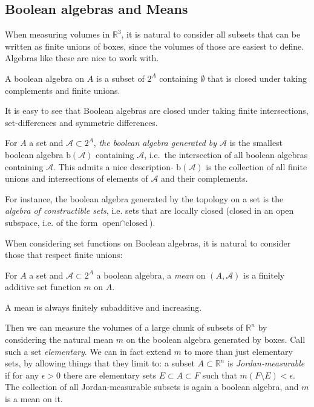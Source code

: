 \documentclass[9pt]{report}
\newtheorem[L]{theorem}{Theorem}[chapter]
\newtheorem[L,nocut]{definition}[theorem]{Definition}
\newtheorem[S,nounderline]{remark}[theorem]{Remarks}
\begin{document}
\subsection{Boolean algebras and Means} 

When measuring volumes in \(\mathbb{R}^3\), it is natural to consider all subsets that can be written as finite unions of boxes, since the volumes of those are easiest to define. Algebras like these are nice to work with.

\begin{definition}
	A boolean algebra on \(A\) is a subset of \(2^A\) containing
	\(\emptyset\) that is closed under taking complements and finite
	unions.
\end{definition}

It is easy to see that Boolean algebras are closed under taking finite intersections, set-differences and symmetric differences.

For \(A\) a set and \(\mathcal{A} \subset 2^A\), \emph{the boolean algebra generated by \(\mathcal{A}\)} is the smallest boolean algebra \(\text{b}(\mathcal{A})\) containing \(\mathcal{A}\), i.e.\ the intersection of all boolean algebras containing \(\mathcal{A}\). This admits a nice description- \(\text{b}(\mathcal{A})\) is the collection of all finite unions and intersections of elements of \(\mathcal{A}\) and their complements.

For instance, the boolean algebra generated by the topology on a set is the \emph{algebra of constructible sets}, i.e. sets that are locally closed (closed in an open subspace, i.e. of the form \(\text{open} \cap \text{closed}\)).

When considering set functions on Boolean algebras, it is natural to consider those that respect finite unions:

\begin{definition}[Mean]
	For \(A\) a set and \(\mathcal{A}\subset 2^A\) a boolean algebra, a \emph{mean} on \((A,\mathcal{A})\) is a finitely additive set function \(m\) on \(A\).
\end{definition}

\begin{remark}
	A mean is always finitely subadditive and increasing.
\end{remark}

Then we can measure the volumes of a large chunk of subsets of \(\mathbb{R}^n\) by considering the natural mean \(m\) on the boolean algebra generated by boxes. Call such a set \emph{elementary}. We can in fact extend \(m\) to more than just elementary sets, by allowing things that they limit to: a subset \(A\subset \mathbb{R}^n\) is \emph{Jordan-measurable} if for any \(\epsilon>0\) there are elementary sets \(E \subset A \subset F\) such that \(m(F\setminus E) < \epsilon\). The collection of all Jordan-measurable subsets is again a boolean algebra, and \(m\) is a mean on it.
\end{document}
